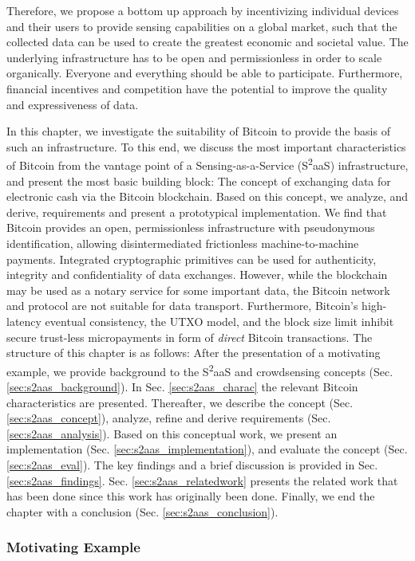 Therefore, we propose a bottom up approach by incentivizing individual devices and their users to provide sensing capabilities on a global market, such that the collected data can be used to create the greatest economic and societal value.
The underlying infrastructure has to be open and permissionless in order to scale organically. Everyone and everything should be able to participate. Furthermore, financial incentives and competition have the potential to improve the quality and expressiveness of data. 

In this chapter, we investigate the suitability of Bitcoin to provide the basis of such an infrastructure. To this end, we discuss the most important characteristics of Bitcoin from the vantage point of a Sensing-as-a-Service (S\textsuperscript{2}aaS) infrastructure, and present the most basic building block: The concept of exchanging data for electronic cash via the Bitcoin blockchain. Based on this concept, we analyze, and derive, requirements and present a prototypical implementation. We find that Bitcoin provides an open, permissionless infrastructure with pseudonymous identification, allowing disintermediated frictionless machine-to-machine payments. Integrated cryptographic primitives can be used for authenticity, integrity and confidentiality of data exchanges. However, while the blockchain may be used as a notary service for some important data, the Bitcoin network and protocol are not suitable for data transport. Furthermore, Bitcoin's high-latency eventual consistency, the \ac{UTXO} model, and the block size limit inhibit secure trust-less micropayments in form of \emph{direct} Bitcoin transactions.
The structure of this chapter is as follows: After the presentation of a motivating example, we provide background to the S\textsuperscript{2}aaS and crowdsensing concepts (Sec. \ref{sec:s2aas_background}). In Sec. \ref{sec:s2aas_charac} the relevant Bitcoin characteristics are presented. Thereafter, we describe the concept (Sec. \ref{sec:s2aas_concept}), analyze, refine and derive requirements (Sec. \ref{sec:s2aas_analysis}). Based on this conceptual work, we present an implementation (Sec. \ref{sec:s2aas_implementation}), and evaluate the concept (Sec. \ref{sec:s2aas_eval}). The key findings and a brief discussion is provided in Sec. \ref{sec:s2aas_findings}. Sec. \ref{sec:s2aas_relatedwork} presents the related work that has been done since this work has originally been done. Finally, we end the chapter with a conclusion (Sec. \ref{sec:s2aas_conclusion}).

\subsubsection*{Motivating Example}

